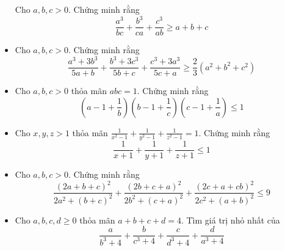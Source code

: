 \documentclass[11pt]{scrartcl}
\begin{document}
\begin{itemize}[label=, leftmargin=0em, itemsep=-0em]
\begin{btvn}
            Cho $a,b,c >0$. Chứng minh rằng
            \[
                \frac{a^3}{bc} + \frac{b^3}{ca} + \frac{c^3}{ab} \geq a + b  +c
            \]
        \end{btvn}
        \item \begin{btvn}
            Cho $a,b,c >0$. Chứng minh rằng
            \[
                \frac{a^3 + 3b^3}{5a + b} + \frac{b^3 + 3c^3}{5b + c} + \frac{c^3 + 3a^3}{5c + a} \geq \frac{2}{3}(a^2 + b^2 + c^2)
            \]
        \end{btvn}
        \item \begin{btvn}
            Cho $a,b,c >0$ thỏa mãn $abc = 1$. Chứng minh rằng
            \[
                \left(a - 1 + \frac{1}{b}\right)\left(b - 1 + \frac{1}{c}\right)\left(c- 1 + \frac{1}{a}\right) \leq 1
            \]
        \end{btvn}
        \item \begin{btvn}
            Cho $x,y,z > 1$ thỏa mãn $\frac{1}{x^2 - 1} + \frac{1}{y^2 - 1} + \frac{1}{z^2 - 1} = 1$. Chứng minh rằng
            \[
                \frac{1}{x + 1} + \frac{1}{y + 1} + \frac{1}{z + 1} \leq 1
            \]
        \end{btvn}
        \item \begin{btvn}
            Cho $a,b,c >0$. Chứng minh rằng
            \[
                \frac{(2a + b + c)^2}{2a^2 + (b + c)^2} + \frac{(2b + c + a)^2}{2b^2 + (c + a)^2} + \frac{(2c + a + cb)^2}{2c^2 + (a + b)^2} \leq 9
            \]
        \end{btvn}
        \item \begin{btvn}
            Cho $a,b,c,d \geq 0$ thỏa mãn $a + b + c + d = 4$. Tìm giá trị nhỏ nhất của
            \[
                \frac{a}{b^3 + 4} + \frac{b}{c^3 + 4} + \frac{c}{d^3 + 4} + \frac{d}{a^3 + 4}
            \]
        \end{btvn}


\end{itemize}
\end{document}

